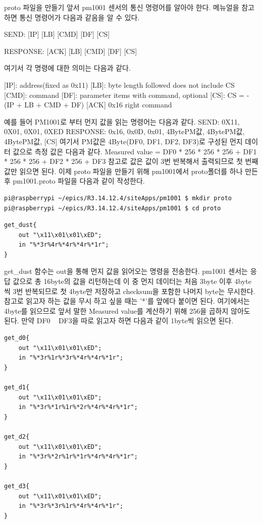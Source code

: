 \documentclass[11pt
  , a4paper
  , article
  , oneside
]{memoir}
\begin{document}
proto 파일을 만들기 앞서 pm1001 센서의 통신 명령어를 알아야 한다. 메뉴얼을 참고하면 통신 명령어가 다음과
같음을 알 수 있다.

        SEND: [IP] [LB] [CMD] [DF] [CS]

        RESPONSE: [ACK] [LB] [CMD] [DF] [CS]

여기서 각 명령에 대한 의미는 다음과 같다.

        [IP]: address(fixed as 0x11)
        [LB]: byte length followed does not include CS
        [CMD]: command
        [DF]: parameter items with command, optional
        [CS]: CS = -(IP + LB + CMD + DF)
        [ACK] 0x16 right command

예를 들어 PM1001로 부터 먼지 값을 읽는 명령어는 다음과 같다.
        SEND: 0X11, 0X01, 0X01, 0XED
        RESPONSE: 0x16, 0x0D, 0x01, 4BytePM값, 4BytePM값, 4BytePM값, [CS]
여기서 PM값은 4Byte(DF0, DF1, DF2, DF3)로 구성된 먼지 데이터 값으로 측정 값은 다음과 같다.
        Measured value = DF0 * 256 * 256 * 256 + DF1 * 256 * 256 + DF2 * 256 + DF3
참고로 값은 값이 3번 반복해서 출력되므로 첫 번째 값만 읽으면 된다.
이제 proto 파일을 만들기 위해 pm1001에서 proto폴더를 하나 만든 후 pm1001.proto 파일을 다음과 같이 작성한다.
\begin{lstlisting}[style=termstyle]
pi@raspberrypi ~/epics/R3.14.12.4/siteApps/pm1001 $ mkdir proto
pi@raspberrypi ~/epics/R3.14.12.4/siteApps/pm1001 $ cd proto
\end{lstlisting}
\begin{lstlisting}[style=termstyle]
get_dust{
	out "\x11\x01\x01\xED";
	in "%*3r%4r%*4r%*4r%*1r";
}
\end{lstlisting}
get\_dust 함수는 out을 통해 먼지 값을 읽어오는 명령을 전송한다. pm1001 센서는 응답 값으로 총 16byte의 
값을 리턴하는데 이 중 먼지 데이터는 처음 3byte 이후 4byte 씩 3번 반복되므로 첫 4byte만 저장하고 
checksum을 포함한 나머지 byte는 무시한다. 참고로 읽고자 하는 값을 무시 하고 싶을 때는 '*'를 앞에다
붙이면 된다. 여기에서는 4byte를 읽으므로 앞서 말한 Measured value를 계산하기 위해 256을 곱하지 않아도 
된다. 만약 DF0 ~ DF3을 따로 읽고자 하면 다음과 같이 1byte씩 읽으면 된다. 
\begin{lstlisting}[style=termstyle]
get_d0{
	out "\x11\x01\x01\xED";
	in "%*3r%1r%*3r%*4r%*4r%*1r";
}

get_d1{
	out "\x11\x01\x01\xED";
	in "%*3r%*1r%1r%*2r%*4r%*4r%*1r";
}

get_d2{
	out "\x11\x01\x01\xED";
	in "%*3r%*2r%1r%*1r%*4r%*4r%*1r";
}

get_d3{
	out "\x11\x01\x01\xED";
	in "%*3r%*3r%1r%*4r%*4r%*1r";
}
\end{lstlisting}
\end{document}
